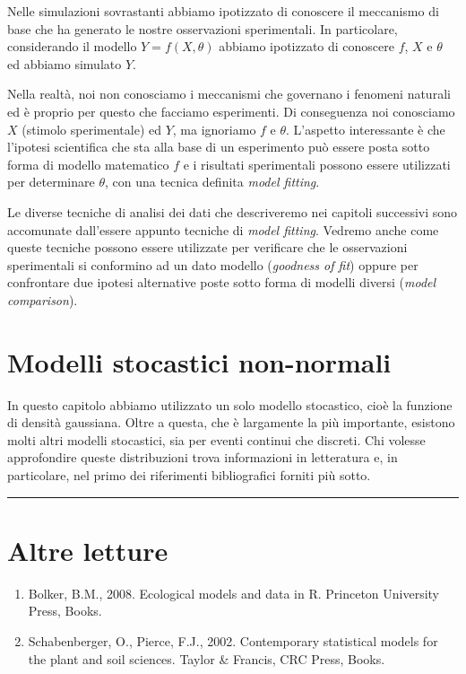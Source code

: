 \documentclass[a4paper,12pt,oneside]{book}
\providecommand{\tightlist}{%
  \setlength{\itemsep}{0pt}\setlength{\parskip}{0pt}}
\begin{document}
Nelle simulazioni sovrastanti abbiamo ipotizzato di conoscere il meccanismo di base che ha generato le nostre osservazioni sperimentali. In particolare, considerando il modello \(Y = f(X, \theta)\) abbiamo ipotizzato di conoscere \(f\), \(X\) e \(\theta\) ed abbiamo simulato \(Y\).

Nella realtà, noi non conosciamo i meccanismi che governano i fenomeni naturali ed è proprio per questo che facciamo esperimenti. Di conseguenza noi conosciamo \(X\) (stimolo sperimentale) ed \(Y\), ma ignoriamo \(f\) e \(\theta\). L'aspetto interessante è che l'ipotesi scientifica che sta alla base di un esperimento può essere posta sotto forma di modello matematico \(f\) e i risultati sperimentali possono essere utilizzati per determinare \(\theta\), con una tecnica definita \emph{model fitting}.

Le diverse tecniche di analisi dei dati che descriveremo nei capitoli successivi sono accomunate dall'essere appunto tecniche di \emph{model fitting}. Vedremo anche come queste tecniche possono essere utilizzate per verificare che le osservazioni sperimentali si conformino ad un dato modello (\emph{goodness of fit}) oppure per confrontare due ipotesi alternative poste sotto forma di modelli diversi (\emph{model comparison}).

\hypertarget{modelli-stocastici-non-normali}{%
\section{Modelli stocastici non-normali}\label{modelli-stocastici-non-normali}}

In questo capitolo abbiamo utilizzato un solo modello stocastico, cioè la funzione di densità gaussiana. Oltre a questa, che è largamente la più importante, esistono molti altri modelli stocastici, sia per eventi continui che discreti. Chi volesse approfondire queste distribuzioni trova informazioni in letteratura e, in particolare, nel primo dei riferimenti bibliografici forniti più sotto.

\begin{center}\rule{0.5\linewidth}{0.5pt}\end{center}

\hypertarget{altre-letture-3}{%
\section{Altre letture}\label{altre-letture-3}}

\begin{enumerate}
\def\labelenumi{\arabic{enumi}.}
\tightlist
\item
  Bolker, B.M., 2008. Ecological models and data in R. Princeton University Press, Books.
\item
  Schabenberger, O., Pierce, F.J., 2002. Contemporary statistical models for the plant and soil sciences. Taylor \& Francis, CRC Press, Books.
\end{enumerate}
\end{document}
